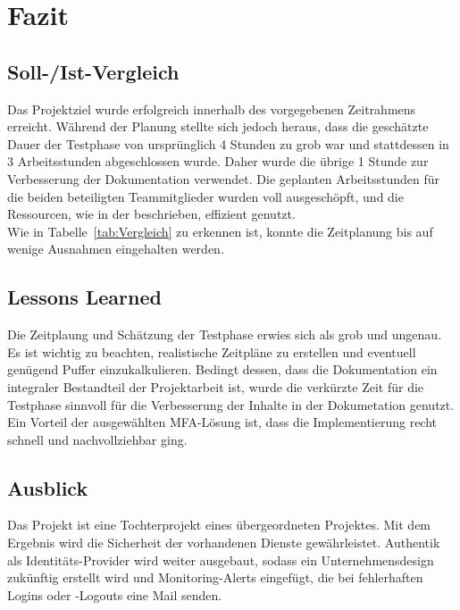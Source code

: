 \section{Fazit} 
\label{sec:Fazit}

\subsection{Soll-/Ist-Vergleich}
\label{sec:SollIstVergleich}
Das Projektziel wurde erfolgreich innerhalb des vorgegebenen Zeitrahmens erreicht. Während der Planung stellte sich jedoch heraus, dass die 
geschätzte Dauer der Testphase von ursprünglich 4 Stunden zu grob war und stattdessen in 3 Arbeitsstunden abgeschlossen wurde. Daher wurde die 
übrige 1 Stunde zur Verbesserung der Dokumentation verwendet. Die geplanten Arbeitsstunden für die beiden beteiligten Teammitglieder 
wurden voll ausgeschöpft, und die Ressourcen, wie in der  beschrieben, effizient genutzt.
\\Wie in Tabelle~\ref{tab:Vergleich}  zu erkennen ist, konnte die Zeitplanung bis auf wenige Ausnahmen eingehalten werden.

\subsection{Lessons Learned}
\label{sec:LessonsLearned}
Die Zeitplaung und Schätzung der Testphase erwies sich als grob und ungenau. Es ist wichtig zu beachten, realistische Zeitpläne zu erstellen 
und eventuell genügend Puffer einzukalkulieren. Bedingt dessen, dass die Dokumentation ein integraler Bestandteil der Projektarbeit ist, 
wurde die verkürzte Zeit für die Testphase sinnvoll für die Verbesserung der Inhalte in der Dokumetation genutzt. Ein Vorteil der 
ausgewählten \acs{MFA}-Lösung ist, dass die Implementierung recht schnell und nachvollziehbar ging.

\subsection{Ausblick}
\label{sec:Ausblick}
Das Projekt ist eine Tochterprojekt eines übergeordneten Projektes. Mit dem Ergebnis wird die Sicherheit der vorhandenen Dienste gewährleistet. 
Authentik als Identitäts-Provider wird weiter ausgebaut, sodass ein Unternehmensdesign zukünftig erstellt wird und Monitoring-Alerts eingefügt, 
die bei fehlerhaften Logins oder -Logouts eine Mail senden.